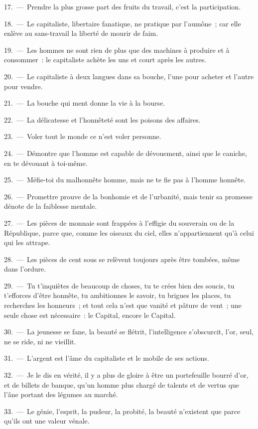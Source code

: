 \documentclass[french,twoside]{book} %
\begin{document}
17. — Prendre la plus grosse part des fruits du travail, c’est la participation.\par
18. — Le capitaliste, libertaire fanatique, ne pratique par l’aumône ; car elle enlève au sans-travail la liberté de mourir de faim.\par
19. — Les hommes ne sont rien de plus que des machines à produire et à consommer : le capitaliste achète les uns et court après les autres.\par
20. — Le capitaliste à deux langues dans sa bouche, l’une pour acheter et l’autre pour vendre.\par
21. — La bouche qui ment donne la vie à la bourse.\par
22. — La délicatesse et l’honnêteté sont les poisons des affaires.\par
23. — Voler tout le monde ce n’est voler personne.\par
24. — Démontre que l’homme est capable de dévouement, ainsi que le caniche, en te dévouant à toi-même.\par
25. — Méfie-toi du malhonnête homme, mais ne te fie pas à l’homme honnête.\par
26. — Promettre prouve de la bonhomie et de l’urbanité, mais tenir sa promesse dénote de la faiblesse mentale.\par
27. — Les pièces de monnaie sont frappées à l’effigie du souverain ou de la République, parce que, comme les oiseaux du ciel, elles n’appartiennent qu’à celui qui les attrape.\par
28. — Les pièces de cent sous se relèvent toujours après être tombées, même dans l’ordure.\par
29. — Tu t’inquiètes de beaucoup de choses, tu te crées bien des soucis, tu t’efforces d’être honnête, tu ambitionnes le savoir, tu brigues les places, tu recherches les honneurs ; et tout cela n’est que vanité et pâture de vent ; une seule chose est nécessaire : le Capital, encore le Capital.\par
30. — La jeunesse se fane, la beauté se flétrit, l’intelligence s’obscurcit, l’or, seul, ne se ride, ni ne vieillit.\par
31. — L'argent est l’âme du capitaliste et le mobile de ses actions.\par
32. — Je le dis en vérité, il y a plus de gloire à être un portefeuille bourré d’or, et de billets de banque, qu’un homme plus chargé de talents et de vertus que l’âne portant des légumes au marché.\par
33. — Le génie, l’esprit, la pudeur, la probité, la beauté n’existent que parce qu’ils ont une valeur vénale.\par
\end{document}
